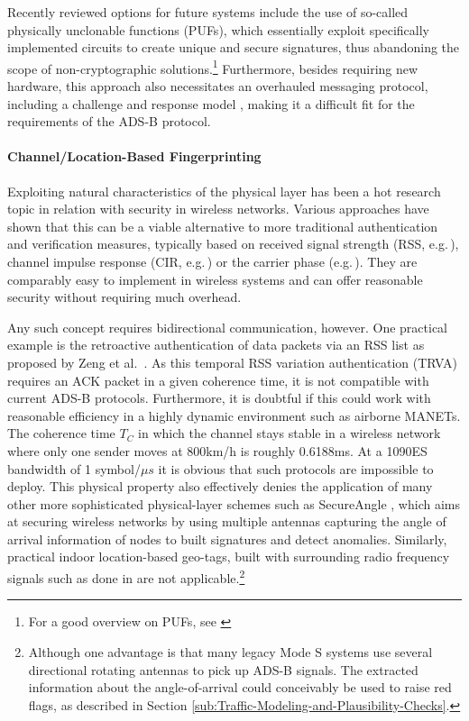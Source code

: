 \documentclass[english]{IEEEtran}
\begin{document}
Recently reviewed options for future systems include the use of so-called
physically unclonable functions (PUFs), which essentially exploit
specifically implemented circuits to create unique and secure signatures,
thus abandoning the scope of non-cryptographic solutions.\footnote{For a good overview on PUFs, see \cite{Maes2010}} Furthermore, besides requiring new hardware, this approach also necessitates
an overhauled messaging protocol, including a challenge and response
model \cite{Devadas2008}, making it a difficult fit for the requirements
of the ADS-B protocol.\\



\paragraph{Channel/Location-Based Fingerprinting}

Exploiting natural characteristics of the physical layer has been
a hot research topic in relation with security in wireless networks.
Various approaches have shown that this can be a viable alternative
to more traditional authentication and verification measures, typically
based on received signal strength (RSS, e.g.\,\cite{Mathur2008}),
channel impulse response (CIR, e.g.\,\cite{Zhang2010a}) or the carrier
phase (e.g.\,\cite{Wang2011a}). They are comparably easy to implement
in wireless systems and can offer reasonable security without requiring
much overhead.

Any such concept requires bidirectional communication, however. One
practical example is the retroactive authentication of data packets
via an RSS list as proposed by Zeng et al.~\cite{Zeng2010}. As this
temporal RSS variation authentication (TRVA) requires an ACK packet
in a given coherence time, it is not compatible with current ADS-B
protocols. Furthermore, it is doubtful if this could work with reasonable
efficiency in a highly dynamic environment such as airborne MANETs.
The coherence time $T_{C}$ in which the channel stays stable in a
wireless network where only one sender moves at 800km/h is roughly
0.6188ms. At a 1090ES bandwidth of 1 symbol/$\mu s$ it is obvious
that such protocols are impossible to deploy. This physical property
also effectively denies the application of many other more sophisticated
physical-layer schemes such as SecureAngle \cite{Xiong}, which aims
at securing wireless networks by using multiple antennas capturing
the angle of arrival information of nodes to built signatures and
detect anomalies. Similarly, practical indoor location-based geo-tags,
built with surrounding radio frequency signals such as done in \cite{Qiu}
are not applicable.\footnote{Although one advantage is that many legacy Mode S systems use several
directional rotating antennas to pick up ADS-B signals. The extracted
information about the angle-of-arrival could conceivably be used to
raise red flags, as described in Section \ref{sub:Traffic-Modeling-and-Plausibility-Checks}.}
\end{document}
